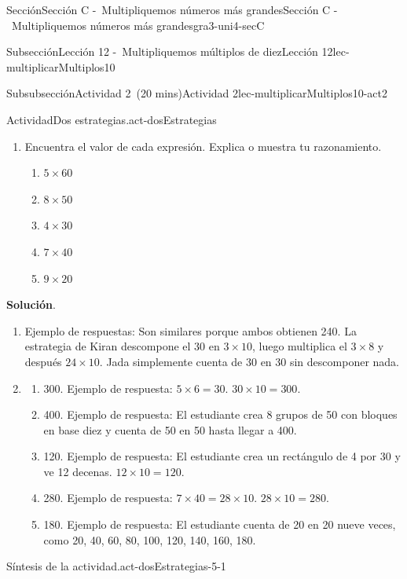 \documentclass[oneside,10pt,]{article}
\newcommand{\blocktitlefont}{\relax}
\begin{document}
\begin{sectionptx}{Sección}{Sección C -~Multipliquemos números más grandes}{}{Sección C -~Multipliquemos números más grandes}{}{}{gra3-uni4-secC}
\begin{subsectionptx}{Subsección}{Lección 12 -~Multipliquemos múltiplos de diez}{}{Lección 12}{}{}{lec-multiplicarMultiplos10}
\begin{subsubsectionptx}{Subsubsección}{Actividad 2~(20 mins)}{}{Actividad 2}{}{}{lec-multiplicarMultiplos10-act2}
\begin{activity}{Actividad}{Dos estrategias.}{act-dosEstrategias}
\begin{enumerate}
\begin{itemize}[label=\textbullet]
\end{itemize}
¿En qué se parecen las estrategias de Jada y de Kiran? ¿En qué son diferentes?%
\item{}Encuentra el valor de cada expresión. Explica o muestra tu razonamiento.%
%
\begin{enumerate}
\item{}\(\displaystyle 5 \times 60\)%
\item{}\(\displaystyle 8 \times 50\)%
\item{}\(\displaystyle 4 \times 30\)%
\item{}\(\displaystyle 7 \times 40\)%
\item{}\(\displaystyle 9 \times 20\)%
\end{enumerate}
\end{enumerate}
\par\smallskip%
\noindent\textbf{\blocktitlefont Solución}.\hypertarget{act-dosEstrategias-3}{}\quad{}%
\begin{enumerate}
\item{}Ejemplo de respuestas: Son similares porque ambos obtienen 240. La estrategia de Kiran descompone el 30 en \(3 \times 10\), luego multiplica el \(3 \times 8\) y después \(24 \times 10\). Jada simplemente cuenta de 30 en 30 sin descomponer nada.%
\item{}%
\begin{enumerate}
\item{}300. Ejemplo de respuesta: \(5 \times 6 = 30\). \(30 \times 10 = 300\).%
\item{}400. Ejemplo de respuesta: El estudiante crea 8 grupos de 50 con bloques en base diez y cuenta de 50 en 50 hasta llegar a 400.%
\item{}120. Ejemplo de respuesta: El estudiante crea un rectángulo de 4 por 30 y ve 12 decenas. \(12 \times 10 = 120\).%
\item{}280. Ejemplo de respuesta: \(7 \times 40 = 28 \times 10\). \(28 \times 10 = 280\).%
\item{}180. Ejemplo de respuesta: El estudiante cuenta de 20 en 20 nueve veces, como 20, 40, 60, 80, 100, 120, 140, 160, 180.%
\end{enumerate}
%
\end{enumerate}
\end{activity}%
\par
\begin{paragraphs}{Síntesis de la actividad.}{act-dosEstrategias-5-1}%
%
\begin{itemize}[label=\textbullet]

\end{itemize}
\end{paragraphs}
\end{subsubsectionptx}
\end{subsectionptx}
\end{sectionptx}
\end{document}
